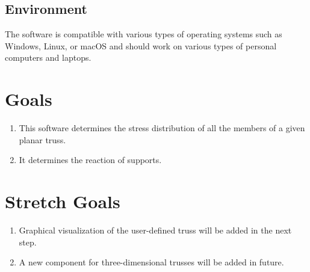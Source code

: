 \documentclass{article}
\begin{document}
\subsection{Environment}
The software is compatible with various types of operating
systems such as Windows, Linux, or macOS and should work on various types of personal computers and laptops.


\section{Goals}
\begin{enumerate}
    \item This software determines the stress distribution of all the members of a given planar truss.
    \item It determines the reaction of supports.
    
\end{enumerate}

\section{Stretch Goals}
\begin{enumerate}
    
    \item Graphical visualization of the user-defined truss will be added in the next step.
    \item A new component for three-dimensional trusses will be added in future.
    
\end{enumerate}
\end{document}

